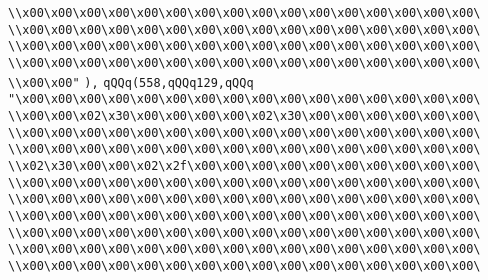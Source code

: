 \verb|\\x00\x00\x00\x00\x00\x00\x00\x00\x00\x00\x00\x00\x00\x00\x00\x00\|\newline
\verb|\\x00\x00\x00\x00\x00\x00\x00\x00\x00\x00\x00\x00\x00\x00\x00\x00\|\newline
\verb|\\x00\x00\x00\x00\x00\x00\x00\x00\x00\x00\x00\x00\x00\x00\x00\x00\|\newline
\verb|\\x00\x00\x00\x00\x00\x00\x00\x00\x00\x00\x00\x00\x00\x00\x00\x00\|\newline
\verb|\\x00\x00"|\newline
\verb|),|\newline
\verb|qQQq(558,qQQq129,qQQq|\newline
\verb|"\x00\x00\x00\x00\x00\x00\x00\x00\x00\x00\x00\x00\x00\x00\x00\x00\|\newline
\verb|\\x00\x00\x02\x30\x00\x00\x00\x00\x02\x30\x00\x00\x00\x00\x00\x00\|\newline
\verb|\\x00\x00\x00\x00\x00\x00\x00\x00\x00\x00\x00\x00\x00\x00\x00\x00\|\newline
\verb|\\x00\x00\x00\x00\x00\x00\x00\x00\x00\x00\x00\x00\x00\x00\x00\x00\|\newline
\verb|\\x02\x30\x00\x00\x02\x2f\x00\x00\x00\x00\x00\x00\x00\x00\x00\x00\|\newline
\verb|\\x00\x00\x00\x00\x00\x00\x00\x00\x00\x00\x00\x00\x00\x00\x00\x00\|\newline
\verb|\\x00\x00\x00\x00\x00\x00\x00\x00\x00\x00\x00\x00\x00\x00\x00\x00\|\newline
\verb|\\x00\x00\x00\x00\x00\x00\x00\x00\x00\x00\x00\x00\x00\x00\x00\x00\|\newline
\verb|\\x00\x00\x00\x00\x00\x00\x00\x00\x00\x00\x00\x00\x00\x00\x00\x00\|\newline
\verb|\\x00\x00\x00\x00\x00\x00\x00\x00\x00\x00\x00\x00\x00\x00\x00\x00\|\newline
\verb|\\x00\x00\x00\x00\x00\x00\x00\x00\x00\x00\x00\x00\x00\x00\x00\x00\|\newline
